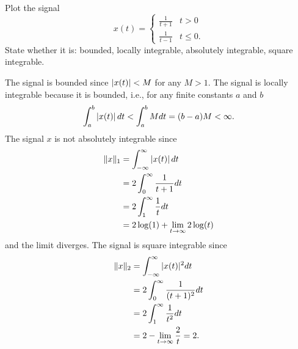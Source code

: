 \begin{excersizelist}
\item \label{exer:functionsquarenotabsint} Plot the signal 
\[
x(t) = \begin{cases}
\tfrac{1}{t+1} & t > 0 \\
\tfrac{1}{t-1} & t \leq 0.
\end{cases}
\]
State whether it is: bounded, locally integrable, absolutely integrable, square integrable.
\begin{solution}
\begin{center}
\end{center}
The signal is bounded since $\left\vert x(t) \right\vert < M$ for any $M > 1$.  The signal is locally integrable because it is bounded, i.e., for any finite constants $a$ and $b$
\[
\int_{a}^b \left\vert x(t) \right\vert dt < \int_{a}^b M dt = (b-a)M < \infty.
\]
The signal $x$ is not absolutely integrable since
\begin{align*}
\|x\|_1 &= \int_{-\infty}^\infty \left\vert x(t) \right\vert dt \\
&= 2 \int_{0}^\infty \frac{1}{t+1} dt \\
&= 2 \int_{1}^\infty \frac{1}{t} dt \\
&= 2\log(1) + \lim_{t \to \infty} 2\log(t)
\end{align*}
and the limit diverges.  The signal is square integrable since
\begin{align*}
\|x\|_2 &= \int_{-\infty}^\infty \vert x(t) \vert^2 dt \\
&= 2 \int_{0}^\infty \frac{1}{(t+1)^2} dt \\
&= 2 \int_{1}^\infty \frac{1}{t^2} dt \\
&= 2 - \lim_{t \to \infty} \frac{2}{t} = 2.
\end{align*}
\end{solution}


\end{excersizelist}
